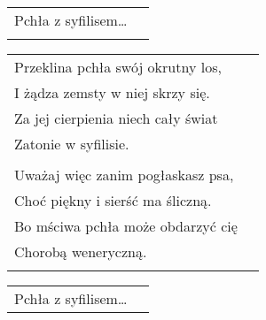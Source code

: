 \documentclass[a5paper]{article}
\begin{document}
\noindent
\begin{tabular}{@{}p{8.5cm}p{3cm}@{}}
Pchła z syfilisem… \\ \\
\end{tabular}

\noindent
\begin{tabular}{@{}p{8.5cm}p{3cm}@{}}
Przeklina pchła swój okrutny los, \\
I żądza zemsty w niej skrzy się. \\
Za jej cierpienia niech cały świat \\
Zatonie w syfilisie. \\ \\

Uważaj więc zanim pogłaskasz psa, \\
Choć piękny i sierść ma śliczną. \\
Bo mściwa pchła może obdarzyć cię \\
Chorobą weneryczną.\\ \\
\end{tabular}

\noindent
\begin{tabular}{@{}p{8.5cm}p{3cm}@{}}
Pchła z syfilisem…
\end{tabular}
\end{document}
